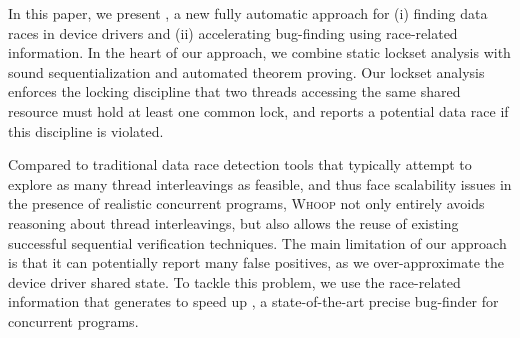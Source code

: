 In this paper, we present \whoop, a new fully automatic approach for (i) finding data races in device drivers and (ii) accelerating bug-finding using race-related information. In the heart of our approach, we combine static lockset analysis with sound sequentialization and automated theorem proving. Our lockset analysis enforces the locking discipline that two threads accessing the same shared resource must hold at least one common lock, and reports a potential data race if this discipline is violated.

Compared to traditional data race detection tools that typically attempt to explore as many thread interleavings as feasible, and thus face scalability issues in the presence of realistic concurrent programs, \textsc{Whoop} not only entirely avoids reasoning about thread interleavings, but also allows the reuse of existing successful sequential verification techniques. The main limitation of our approach is that it can potentially report many false positives, as we over-approximate the device driver shared state. To tackle this problem, we use the race-related information that \whoop generates to speed up \corral, a state-of-the-art precise bug-finder for concurrent programs.